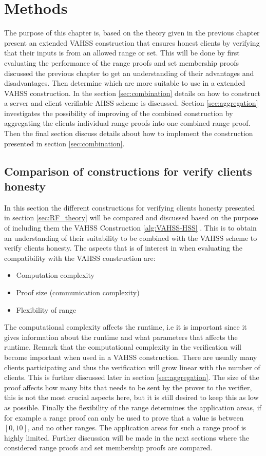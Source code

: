 \chapter{Methods}
\label{ch:Methods}

The purpose of this chapter is, based on the theory given in the previous chapter present an extended VAHSS construction that ensures honest clients by verifying that their inputs is from an allowed range or set. This will be done by first evaluating the performance of the range proofs and set membership proofs discussed the previous chapter to get an understanding of their advantages and disadvantages. Then determine which are more suitable to use in a extended VAHSS construction. In the section \ref{sec:combination} details on how to construct a server and client verifiable AHSS scheme is discussed. Section \ref{sec:aggregation} investigates the possibility of  improving of the combined construction by aggregating the  clients individual range proofs into one combined range proof. Then the final section discuss details about how to implement the construction presented in section \ref{sec:combination}.

\section{Comparison of constructions for verify clients honesty}
In this section the different constructions for verifying clients honesty presented in section \ref{sec:RF_theory} will be compared and discussed based on the purpose of including them the VAHSS Construction \ref{alg:VAHSS-HSS} . This is to obtain an understanding of their suitability to be combined with the VAHSS scheme to verify clients honesty. The aspects that  is of interest in when evaluating the compatibility with the VAHSS construction are:
\begin{itemize}
    \item Computation complexity  
    \item Proof size (communication complexity)
    \item Flexibility of range
\end{itemize}
The computational complexity affects the runtime, i.e it is important since it gives information about the runtime and what parameters that affects the runtime. Remark that the computational complexity in the verification  will become important when used in a VAHSS construction. There are usually many clients participating and thus the verification will grow linear with the number of clients. This is further discussed later in section \ref{sec:aggregation}. The size of the proof affects how many bits that needs to be sent by the prover to the verifier, this is not the most crucial aspects here, but it is still desired to keep this as low as possible. Finally the flexibility of the range determines the application areas, if for example a range proof can only be used to prove that a value is between $[0,10]$, and no other ranges. The application areas for such a range proof is highly limited. Further discussion will be made in the next sections where the considered range proofs and set membership proofs are compared.


